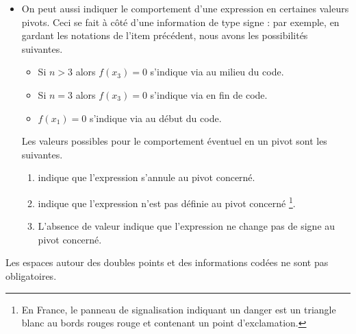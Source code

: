 \begin{enumerate}
\begin{itemize}
        \item On peut aussi indiquer le comportement d'une expression en certaines valeurs pivots. Ceci se fait à côté d'une information de type signe : par exemple, en gardant les notations de l'item précédent, nous avons les possibilités suivantes.
        \begin{itemize}
            \item Si $n > 3$ alors $f(x_3) = 0$ s'indique via  au milieu du code.

            \item Si $n = 3$ alors $f(x_3) = 0$ s'indique via  en fin de code.

            \item $f(x_1) = 0$ s'indique via     au début du code.
        \end{itemize}
        Les valeurs possibles pour le comportement éventuel en un pivot sont les suivantes.
        \begin{enumerate}
            \item {} indique que
l'expression s'annule au pivot concerné.

            \item \tdoclatexin{!} indique que
l'expression n'est pas définie au pivot concerné
            \footnote{
                En France, le panneau de signalisation indiquant un danger est un triangle blanc au bords rouges rouge et contenant un point d'exclamation.
            }.

            \item L'absence de valeur indique que l'expression ne change pas de signe au pivot concerné.
        \end{enumerate}
    \end{itemize}
\end{enumerate}








\begin{tdocnote}
    Les espaces autour des doubles points et des informations codées ne sont pas obligatoires.
\end{tdocnote}




